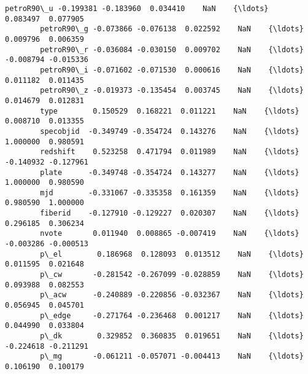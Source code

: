 \documentclass[11pt]{article}
\begin{document}
\begin{Verbatim}[commandchars=\\\{\}]
        petroR90\_u -0.199381 -0.183960  0.034410    NaN    {\ldots}     0.083497  0.077905   
        petroR90\_g -0.073866 -0.076138  0.022592    NaN    {\ldots}     0.009796  0.006359   
        petroR90\_r -0.036084 -0.030150  0.009702    NaN    {\ldots}    -0.008794 -0.015336   
        petroR90\_i -0.071602 -0.071530  0.000616    NaN    {\ldots}     0.011182  0.011435   
        petroR90\_z -0.019373 -0.135454  0.003745    NaN    {\ldots}     0.014679  0.012831   
        type        0.150529  0.168221  0.011221    NaN    {\ldots}     0.008710  0.013355   
        specobjid  -0.349749 -0.354724  0.143276    NaN    {\ldots}     1.000000  0.980591   
        redshift    0.523258  0.471794  0.011989    NaN    {\ldots}    -0.140932 -0.127961   
        plate      -0.349748 -0.354724  0.143277    NaN    {\ldots}     1.000000  0.980590   
        mjd        -0.331067 -0.335358  0.161359    NaN    {\ldots}     0.980590  1.000000   
        fiberid    -0.127910 -0.129227  0.020307    NaN    {\ldots}     0.296185  0.306234   
        nvote       0.011940  0.008865 -0.007419    NaN    {\ldots}    -0.003286 -0.000513   
        p\_el        0.186968  0.128093  0.013512    NaN    {\ldots}     0.011595  0.021648   
        p\_cw       -0.281542 -0.267099 -0.028859    NaN    {\ldots}     0.093988  0.082553   
        p\_acw      -0.240889 -0.220856 -0.032367    NaN    {\ldots}     0.056945  0.045701   
        p\_edge     -0.271764 -0.236468  0.001217    NaN    {\ldots}     0.044990  0.033804   
        p\_dk        0.329852  0.360835  0.019651    NaN    {\ldots}    -0.224618 -0.211291   
        p\_mg       -0.061211 -0.057071 -0.004413    NaN    {\ldots}     0.106190  0.100179   
        

\end{Verbatim}
\end{document}
